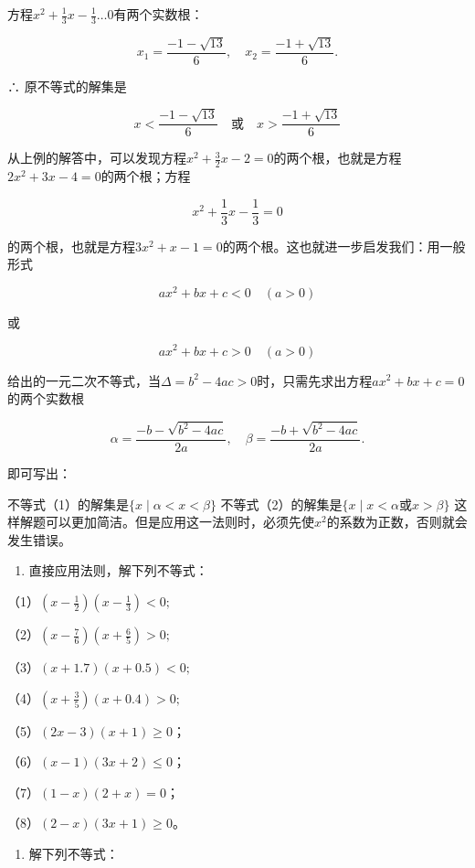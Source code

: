 方程\(x^{2} + \frac{1}{3} x - \frac{1}{3}\dots 0\)有两个实数根：

\[
x_{1} = \frac{- 1 - \sqrt{13}}{6}, \quad x_{2} = \frac{- 1 + \sqrt{13}}{6}.
\]

∴ 原不等式的解集是

\[
x < \frac{- 1 - \sqrt{13}}{6} \quad \text{或} \quad x > \frac{- 1 + \sqrt{13}}{6}
\]

从上例的解答中，可以发现方程\(x^{2} + \frac{3}{2} x - 2 = 0\)的两个根，也就是方程\(2x^{2} + 3x - 4 = 0\)的两个根；方程

\[
x^{2} + \frac{1}{3} x - \frac{1}{3} = 0
\]

的两个根，也就是方程\(3x^{2} + x - 1 = 0\)的两个根。这也就进一步启发我们：用一般形式

\[
a x^{2} + b x + c < 0 \quad (a > 0) \tag {1}
\]

或

\[
a x^{2} + b x + c > 0 \quad (a > 0) \tag {2}
\]

给出的一元二次不等式，当\(\Delta = b^{2} - 4ac > 0\)时，只需先求出方程\(ax^{2}+bx+c=0\)的两个实数根

\[
\alpha=\frac{-b-\sqrt{b^{2} - 4 a c}}{2 a}, \quad \beta = \frac{- b + \sqrt{b^{2} - 4 a c}}{2 a}.
\]

即可写出：

不等式（1）的解集是\(\{x\mid \alpha < x < \beta \}\)
不等式（2）的解集是\(\{x\mid x < \alpha\)或\(x > \beta \}\)
这样解题可以更加简洁。但是应用这一法则时，必须先使\(x^{2}\)的系数为正数，否则就会发生错误。

\begin{enumerate}
\item
  直接应用法则，解下列不等式：
\end{enumerate}

（1）\(\left(x - \frac{1}{2}\right)\left(x - \frac{1}{3}\right) < 0;\)

（2）\(\left(x-\frac{7}{6}\right)\left(x + \frac{6}{5}\right) > 0;\)

（3）\((x + 1.7)(x + 0.5) < 0;\)

（4）\(\left(x + \frac{3}{5}\right)(x + 0.4) > 0;\)

（5）\((2x - 3)(x + 1) \geqslant 0\)；

（6）\((x - 1)(3x + 2) \leqslant 0\)；

（7）\((1 - x)(2 + x) = 0\)；

（8）\((2 - x)(3x + 1) \geqslant 0\)。

\begin{enumerate}[start=2]
\item
  解下列不等式：
\end{enumerate}


